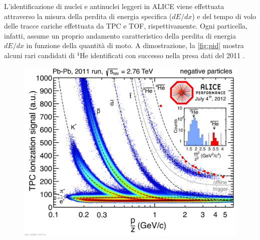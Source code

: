 L'identificazione di nuclei e antinuclei leggeri in ALICE viene effettuata attraverso la misura della perdita di energia specifica ($dE/dx$) e del tempo di volo delle tracce cariche effettuata da TPC e TOF, rispettivamente.
Ogni particella, infatti, assume un proprio andamento caratteristico della perdita di energia $dE/dx$ in funzione della quantità di moto.
A dimostrazione, la \autoref{fig:pid} mostra alcuni rari candidati di $^4\overline{\text{He}}$ identificati con successo nella presa dati del 2011 \cite{refId0_exotica}.
\begin{figure}[ht]
    \centering
    \includegraphics[width=0.7\linewidth]{image/1-alice/PID.png}
    \label{fig:pid}
\end{figure}